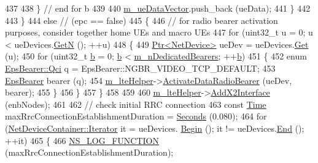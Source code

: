 \begin{DoxyCode}
437 
438             \} \textcolor{comment}{// end for b}
439 
440           \hyperlink{classLteX2HandoverMeasuresTestCase_ae4fab68537e923187590910f07df7df5}{m\_ueDataVector}.push\_back (ueData);
441         \}
442 
443     \}
444   \textcolor{keywordflow}{else} \textcolor{comment}{// (epc == false)}
445     \{
446       \textcolor{comment}{// for radio bearer activation purposes, consider together home UEs and macro UEs}
447       \textcolor{keywordflow}{for} (uint32\_t u = 0; u < ueDevices.\hyperlink{classns3_1_1NetDeviceContainer_a74cafc212479bc38976bebd118e856b9}{GetN} (); ++u)
448         \{
449           \hyperlink{classns3_1_1Ptr}{Ptr<NetDevice>} ueDev = ueDevices.\hyperlink{classns3_1_1NetDeviceContainer_a677d62594b5c9d2dea155cc5045f4d0b}{Get} (u);
450           \textcolor{keywordflow}{for} (uint32\_t \hyperlink{buildings__pathloss_8m_a21ad0bd836b90d08f4cf640b4c298e7c}{b} = 0; \hyperlink{buildings__pathloss_8m_a21ad0bd836b90d08f4cf640b4c298e7c}{b} < \hyperlink{classLteX2HandoverMeasuresTestCase_ad17cde512352c02e24f17299705add5c}{m\_nDedicatedBearers}; ++\hyperlink{buildings__pathloss_8m_a21ad0bd836b90d08f4cf640b4c298e7c}{b})
451             \{
452               \textcolor{keyword}{enum} \hyperlink{structns3_1_1EpsBearer_aecf0c67109c5eb4ec0b07226fff5885e}{EpsBearer::Qci} q = EpsBearer::NGBR\_VIDEO\_TCP\_DEFAULT;
453               \hyperlink{structns3_1_1EpsBearer}{EpsBearer} bearer (q);
454               \hyperlink{classLteX2HandoverMeasuresTestCase_a5d9f434c242eb81dba2d8e99c43e7046}{m\_lteHelper}->\hyperlink{classns3_1_1LteHelper_ac896e16cf162e4beeaa292d39ab1b700}{ActivateDataRadioBearer} (ueDev, bearer);
455             \}
456         \}
457     \}
458 
459 
460   \hyperlink{classLteX2HandoverMeasuresTestCase_a5d9f434c242eb81dba2d8e99c43e7046}{m\_lteHelper}->\hyperlink{classns3_1_1LteHelper_adbbd435f439200097e88a2965668bc26}{AddX2Interface} (enbNodes);
461 
462   \textcolor{comment}{// check initial RRC connection}
463   \textcolor{keyword}{const} \hyperlink{classns3_1_1Time}{Time} maxRrcConnectionEstablishmentDuration = \hyperlink{group__timecivil_ga33c34b816f8ff6628e33d5c8e9713b9e}{Seconds} (0.080);
464   \textcolor{keywordflow}{for} (\hyperlink{classns3_1_1NetDeviceContainer_a45709bb572f975569ed985fa89b132f8}{NetDeviceContainer::Iterator} it = ueDevices.
      \hyperlink{classns3_1_1NetDeviceContainer_ad5aac47677fe7277e232bdec5b48a8fc}{Begin} (); it != ueDevices.\hyperlink{classns3_1_1NetDeviceContainer_a8af596b06daf9613da60b4379861d770}{End} (); ++it)
465     \{
466       \hyperlink{log-macros-disabled_8h_a90b90d5bad1f39cb1b64923ea94c0761}{NS\_LOG\_FUNCTION} (maxRrcConnectionEstablishmentDuration);

\end{DoxyCode}
